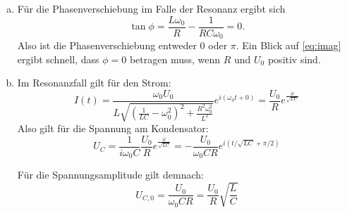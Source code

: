 \begin{enumerate}[(a)]
\item Für die Phasenverschiebung im Falle der Resonanz ergibt sich
\begin{equation}
\tan{\phi} = \frac{L\omega_0}{R} -\frac{1}{RC\omega_0} = 0.
\end{equation}
Also ist die Phasenverschiebung entweder $0$ oder $\pi$. Ein Blick auf \vref{eq:imag} ergibt schnell, dass $\phi = 0$ betragen muss, wenn $R$ und $U_0$ positiv sind.
\item 
Im Resonanzfall gilt für den Strom:
\begin{equation}
I(t)=\frac{\omega_0 U_0}{L\sqrt{\left(\frac{1}{LC} -\omega_0^2 \right)^2+\frac{R^2\omega_0^2}{L^2}}}e^{i(\omega_0 t +0)} = \frac{U_0}{R} e^{{\frac{it}{\sqrt{LC}}}}
\end{equation}
Also gilt für die Spannung am Kondensator:
\begin{equation}
U_C = \frac{1}{i\omega_0 C} \frac{U_0}{R}e^{{\frac{it}{\sqrt{LC}}}} = -\frac{U_0}{\omega_0CR} e^{i\left(t/\sqrt{LC} +\pi/2 \right)}
\end{equation}

Für die Spannungsamplitude gilt demnach:
\begin{equation}
U_{C,0} = \frac{U_0}{\omega_0CR} = \frac{U_0}{R}\sqrt{\frac{L}{C}}
\end{equation}
\end{enumerate}